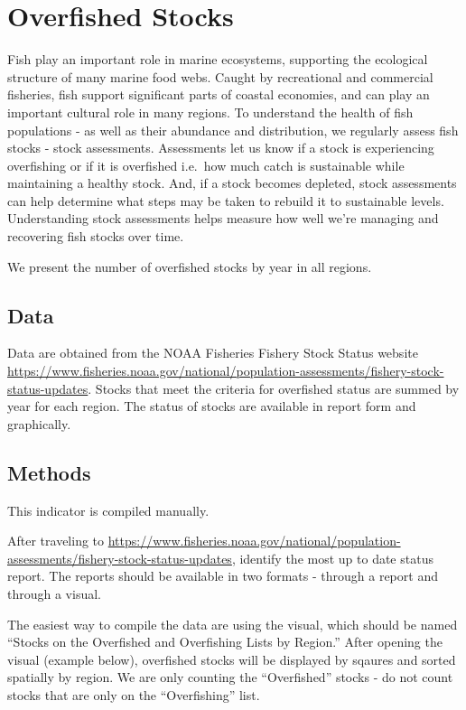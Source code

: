 \documentclass[
]{book}
\begin{document}
\hypertarget{overfished-stocks}{%
\chapter{Overfished Stocks}\label{overfished-stocks}}

Fish play an important role in marine ecosystems, supporting the ecological structure of many marine food webs. Caught by recreational and commercial fisheries, fish support significant parts of coastal economies, and can play an important cultural role in many regions. To understand the health of fish populations - as well as their abundance and distribution, we regularly assess fish stocks - stock assessments. Assessments let us know if a stock is experiencing overfishing or if it is overfished i.e.~how much catch is sustainable while maintaining a healthy stock. And, if a stock becomes depleted, stock assessments can help determine what steps may be taken to rebuild it to sustainable levels. Understanding stock assessments helps measure how well we're managing and recovering fish stocks over time.

We present the number of overfished stocks by year in all regions.

\hypertarget{data-5}{%
\section{Data}\label{data-5}}

Data are obtained from the NOAA Fisheries Fishery Stock Status website \url{https://www.fisheries.noaa.gov/national/population-assessments/fishery-stock-status-updates}. Stocks that meet the criteria for overfished status are summed by year for each region. The status of stocks are available in report form and graphically.

\hypertarget{methods-5}{%
\section{Methods}\label{methods-5}}

This indicator is compiled manually.

After traveling to \url{https://www.fisheries.noaa.gov/national/population-assessments/fishery-stock-status-updates}, identify the most up to date status report. The reports should be available in two formats - through a report and through a visual.

The easiest way to compile the data are using the visual, which should be named ``Stocks on the Overfished and Overfishing Lists by Region.'' After opening the visual (example below), overfished stocks will be displayed by sqaures and sorted spatially by region. We are only counting the ``Overfished'' stocks - do not count stocks that are only on the ``Overfishing'' list.
\end{document}
